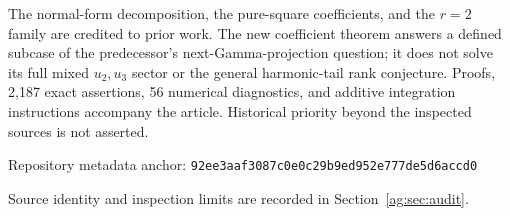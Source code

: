 \documentclass[11pt,letterpaper]{article}
\numberwithin{equation}{section}
\theoremstyle{definition}\newtheorem{definition}[theorem]{Definition}
\theoremstyle{remark}\newtheorem{remark}[theorem]{Remark}
\newcommand{\pin}{92ee3aaf3087c0e0c29b9ed952e777de5d6accd0}
\begin{document}
\begin{titlepage}
\begin{minipage}{0.93\textwidth}
The normal-form decomposition, the pure-square coefficients, and the
$r=2$ family are credited to prior work. The new coefficient theorem
answers a defined subcase of the predecessor's next-Gamma-projection
question; it does not solve its full mixed $u_2,u_3$ sector or the general
harmonic-tail rank conjecture. Proofs, 2,187 exact assertions, 56 numerical
diagnostics, and additive integration instructions accompany the article.
Historical priority beyond the inspected sources is not asserted.
\end{minipage}
\vfill
{\small Repository metadata anchor: \texttt{\pin}\par}
{\small Source identity and inspection limits are recorded in Section~\ref{ag:sec:audit}.\par}
\end{titlepage}
\hypersetup{pageanchor=true}
{\small\setlength{\parskip}{0pt}\tableofcontents}
\clearpage{}












\end{document}
